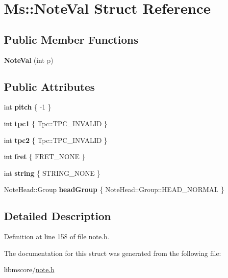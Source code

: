 \hypertarget{struct_ms_1_1_note_val}{}\section{Ms\+:\+:Note\+Val Struct Reference}
\label{struct_ms_1_1_note_val}
\subsection*{Public Member Functions}
\begin{DoxyCompactItemize}
\item 
\mbox{\label{struct_ms_1_1_note_val_ace84d82b4d870df423ba388ee99b698a}} 
{\bfseries Note\+Val} (int p)
\end{DoxyCompactItemize}
\subsection*{Public Attributes}
\begin{DoxyCompactItemize}
\item 
\mbox{\label{struct_ms_1_1_note_val_a9c60bba3732f3662a4d847970745d06f}} 
int {\bfseries pitch} \{ -\/1 \}
\item 
\mbox{\label{struct_ms_1_1_note_val_a179950ddba0d1671b70f629f443c4439}} 
int {\bfseries tpc1} \{ Tpc\+::\+T\+P\+C\+\_\+\+I\+N\+V\+A\+L\+ID \}
\item 
\mbox{\label{struct_ms_1_1_note_val_a90b20d1d69361fb0b3faf6c075503f10}} 
int {\bfseries tpc2} \{ Tpc\+::\+T\+P\+C\+\_\+\+I\+N\+V\+A\+L\+ID \}
\item 
\mbox{\label{struct_ms_1_1_note_val_a8270e311f788d10ba134ec92697577ce}} 
int {\bfseries fret} \{ F\+R\+E\+T\+\_\+\+N\+O\+NE \}
\item 
\mbox{\label{struct_ms_1_1_note_val_a473152509694563ec04a32ef05df165f}} 
int {\bfseries string} \{ S\+T\+R\+I\+N\+G\+\_\+\+N\+O\+NE \}
\item 
\mbox{\label{struct_ms_1_1_note_val_a67e86e31154ea0cea7a5d6dca85784d4}} 
Note\+Head\+::\+Group {\bfseries head\+Group} \{ Note\+Head\+::\+Group\+::\+H\+E\+A\+D\+\_\+\+N\+O\+R\+M\+AL \}
\end{DoxyCompactItemize}


\subsection{Detailed Description}


Definition at line 158 of file note.\+h.



The documentation for this struct was generated from the following file\+:\begin{DoxyCompactItemize}
\item 
libmscore/\hyperlink{note_8h}{note.\+h}\end{DoxyCompactItemize}
